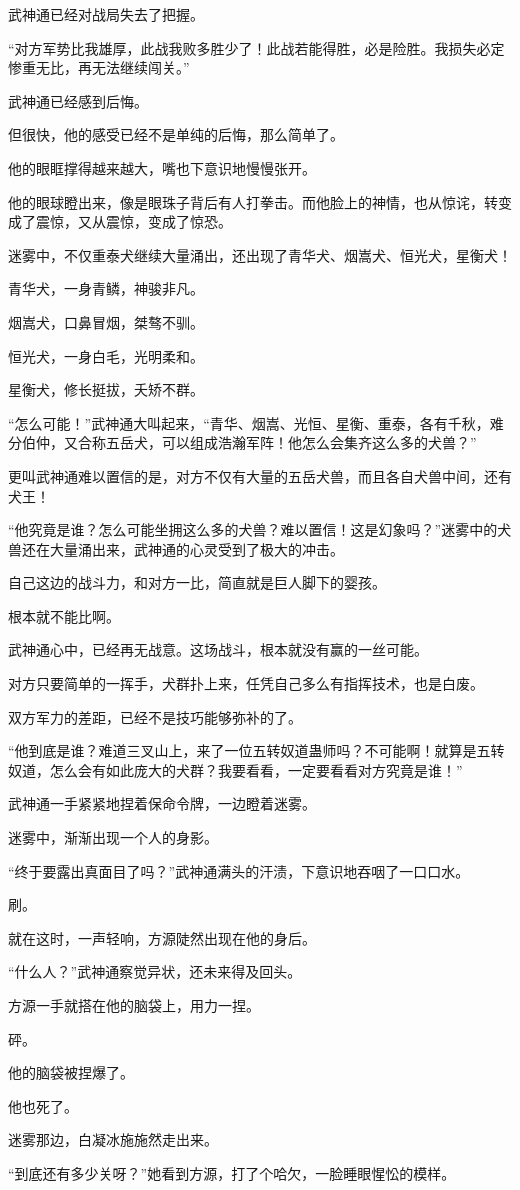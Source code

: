 \begin{this_body}
武神通已经对战局失去了把握。

“对方军势比我雄厚，此战我败多胜少了！此战若能得胜，必是险胜。我损失必定惨重无比，再无法继续闯关。”

武神通已经感到后悔。

但很快，他的感受已经不是单纯的后悔，那么简单了。

他的眼眶撑得越来越大，嘴也下意识地慢慢张开。

他的眼球瞪出来，像是眼珠子背后有人打拳击。而他脸上的神情，也从惊诧，转变成了震惊，又从震惊，变成了惊恐。

迷雾中，不仅重泰犬继续大量涌出，还出现了青华犬、烟嵩犬、恒光犬，星衡犬！

青华犬，一身青鳞，神骏非凡。

烟嵩犬，口鼻冒烟，桀骜不驯。

恒光犬，一身白毛，光明柔和。

星衡犬，修长挺拔，夭矫不群。

“怎么可能！”武神通大叫起来，“青华、烟嵩、光恒、星衡、重泰，各有千秋，难分伯仲，又合称五岳犬，可以组成浩瀚军阵！他怎么会集齐这么多的犬兽？”

更叫武神通难以置信的是，对方不仅有大量的五岳犬兽，而且各自犬兽中间，还有犬王！

“他究竟是谁？怎么可能坐拥这么多的犬兽？难以置信！这是幻象吗？”迷雾中的犬兽还在大量涌出来，武神通的心灵受到了极大的冲击。

自己这边的战斗力，和对方一比，简直就是巨人脚下的婴孩。

根本就不能比啊。

武神通心中，已经再无战意。这场战斗，根本就没有赢的一丝可能。

对方只要简单的一挥手，犬群扑上来，任凭自己多么有指挥技术，也是白废。

双方军力的差距，已经不是技巧能够弥补的了。

“他到底是谁？难道三叉山上，来了一位五转奴道蛊师吗？不可能啊！就算是五转奴道，怎么会有如此庞大的犬群？我要看看，一定要看看对方究竟是谁！”

武神通一手紧紧地捏着保命令牌，一边瞪着迷雾。

迷雾中，渐渐出现一个人的身影。

“终于要露出真面目了吗？”武神通满头的汗渍，下意识地吞咽了一口口水。

刷。

就在这时，一声轻响，方源陡然出现在他的身后。

“什么人？”武神通察觉异状，还未来得及回头。

方源一手就搭在他的脑袋上，用力一捏。

砰。

他的脑袋被捏爆了。

他也死了。

迷雾那边，白凝冰施施然走出来。

“到底还有多少关呀？”她看到方源，打了个哈欠，一脸睡眼惺忪的模样。

\end{this_body}


